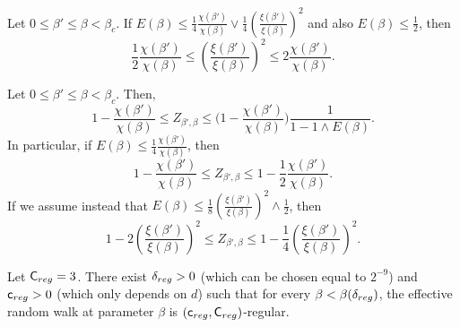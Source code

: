 \documentclass[10pt,a4paper]{amsart}
\newcommand\Creg{\mathsf{C}_{\textup{reg}}}
\newcommand\creg{\mathsf{c}_{\textup{reg}}}
\newcommand{\deltareg}{\delta_{\textup{reg}}}
\begin{document}
\begin{Coro}
\label{cor: comparison chi xi when E small}	
Let $0\leq \beta'\leq \beta< \beta_c$.
If $E(\beta)\leq \frac{1}{4}\frac{\chi(\beta')}{\chi(\beta)} \vee \frac{1}{4}(\frac{\xi(\beta')}{\xi(\beta)})^2$ and also $E(\beta)\leq \tfrac{1}{2}$, then
\begin{equation}
\label{eq: comparison chi xi when E small}
	\frac{1}{2}\frac{\chi(\beta')}{\chi(\beta)}
    \leq
    \left(\frac{\xi(\beta')}{\xi(\beta)}\right)^2\leq 2\frac{\chi(\beta')}{\chi(\beta)}.
\end{equation}
\end{Coro}

\begin{Prop}
\label{prop:Zbd}
Let $0\leq \beta'\leq \beta<\beta_c$. Then,
\begin{equation}
\label{eq: bounds on Z1}
	1-\frac{\chi(\beta')}{\chi(\beta)}\leq Z_{\beta',\beta}\leq \Big(1-\frac{\chi(\beta')}{\chi(\beta)}\Big)\frac{1}{1-1\wedge E(\beta)}.
\end{equation}
In particular, if $E(\beta)\leq \tfrac{1}{4}\tfrac{\chi(\beta')}{\chi(\beta)}$, then
\begin{equation}\label{eq: explicit bounds on Z1}
	1-\frac{\chi(\beta')}{\chi(\beta)}\leq Z_{\beta',\beta}\leq 1-\frac{1}{2}\frac{\chi(\beta')}{\chi(\beta)}.
\end{equation}
If we assume instead
that $E(\beta)\leq \tfrac{1}{8}(\tfrac{\xi(\beta')}{\xi(\beta)})^2 \wedge \tfrac{1}{2}$, then
\begin{equation}
\label{eq: bounds on Z in terms of n/N}
	1-2\left(\frac{\xi(\beta')}{\xi(\beta)}\right)^2\leq Z_{\beta',\beta}\leq 1-\frac{1}{4}\left(\frac{\xi(\beta')}{\xi(\beta)}\right)^2.
\end{equation}
\end{Prop}

\begin{Prop}
\label{prop: regularity below beta(delta)}
Let $\Creg =3$. There exist $\deltareg>0$ (which can be chosen equal to $2^{-9}$) and $\creg>0$ (which only depends on $d$) such that for every $\beta< \beta(\deltareg)$, the effective random walk at parameter $\beta$ is $(\creg,\Creg)$-regular.
\end{Prop}
\end{document}
